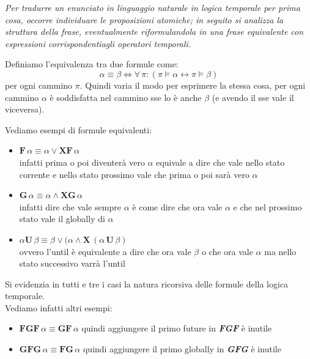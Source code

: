 \documentclass[a4paper,12pt, oneside]{book}
\begin{document}
\textit{Per tradurre un enunciato in linguaggio naturale in logica temporale per
  prima cosa, occorre individuare le proposizioni atomiche; in seguito si
  analizza la struttura della frase, eventualmente riformulandola in una frase
  equivalente con espressioni corrispondentiagli operatori temporali.}\\
\begin{definizione}
  Definiamo l'equivalenza tra due formule come:
  \[\alpha\equiv \beta\iff \forall\,\pi:(\pi\vDash\alpha\leftrightarrow\pi\vDash
    \beta)\]
  per ogni cammino $\pi$. Quindi varia il modo per esprimere la stessa cosa, per
  ogni cammino $\alpha$ è soddisfatta nel cammino sse lo è anche $\beta$ (e
  avendo il sse vale il viceversa).
\end{definizione}
\begin{esempio}
  Vediamo esempi di formule equivalenti:
  \begin{itemize}
    \item $\mathbf{F}\,\alpha\equiv\alpha\lor\mathbf{XF}\,\alpha$\\
    infatti prima o poi diventerà vero $\alpha$ equivale a dire che vale nello
    stato corrente e nello stato prossimo vale che prima o poi sarà vero
    $\alpha$ 
    \item $\mathbf{G}\,\alpha\equiv\alpha\land\mathbf{XG}\,\alpha$\\
    infatti dire che vale sempre $\alpha$ è come dire che ora vale $\alpha$ e
    che nel prossimo stato vale il globally di $\alpha$
    \item $\alpha\mathbf{U}\,\beta\equiv\beta\lor(\alpha\land
    \mathbf{X}\,(\alpha\,\mathbf{U}\,\beta)$ \\
    ovvero l'until è equivalente a dire che ora vale $\beta$ o che ora vale
    $\alpha$ ma nello stato successivo varrà l'until
  \end{itemize}
  Si evidenzia in tutti e tre i casi la natura ricorsiva delle formule della
  logica temporale.\\
  Vediamo infatti altri esempi:
  \begin{itemize}
    \item $\mathbf{FGF}\,\alpha\equiv\mathbf{GF}\,\alpha$
    quindi aggiungere il primo future in \textbf{\textit{FGF}} è inutile
    \item $\mathbf{GFG}\,\alpha\equiv\mathbf{FG}\,\alpha$
    quindi aggiungere il primo globally in \textbf{\textit{GFG}} è inutile   
  \end{itemize}
\end{esempio}
\end{document}
